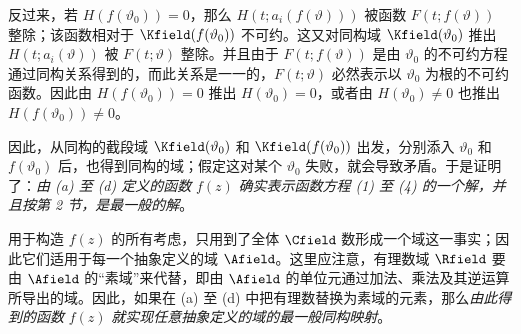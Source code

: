 反过来，若 $H(f(\vartheta_0))=0$，那么 $H(t;a_i(f(\vartheta)))$ 被函数 $F(t;f(\vartheta))$ 整除；该函数相对于 $\Kfield(f(\vartheta_0))$ 不可约。这又对同构域 $\Kfield(\vartheta_0)$ 推出 $H(t;a_i(\vartheta))$ 被 $F(t;\vartheta)$ 整除。并且由于 $F(t;f(\vartheta))$ 是由 $\vartheta_0$ 的不可约方程通过同构关系得到的，而此关系是一一的，$F(t;\vartheta)$ 必然表示以 $\vartheta_0$ 为根的不可约函数。因此由 $H(f(\vartheta_0))=0$ 推出 $H(\vartheta_0)=0$，或者由 $H(\vartheta_0)\ne0$ 也推出 $H(f(\vartheta_0))\ne0$。

因此，从同构的截段域 $\Kfield(\vartheta_0)$ 和 $\Kfield(f(\vartheta_0))$ 出发，分别添入 $\vartheta_0$ 和 $f(\vartheta_0)$ 后，也得到同构的域；假定这对某个 $\vartheta_0$ 失败，就会导致矛盾。于是证明了：\emph{由 (a) 至 (d) 定义的函数} $f(z)$ \emph{确实表示函数方程 (1) 至 (4) 的一个解，并且按第 2 节，是最一般的解}。

用于构造 $f(z)$ 的所有考虑，只用到了全体 $\Cfield$ 数形成一个域这一事实；因此它们适用于每一个抽象定义的域 $\Afield$。这里应注意，有理数域 $\Rfield$ 要由 $\Afield$ 的“素域”来代替，即由 $\Afield$ 的单位元通过加法、乘法及其逆运算所导出的域。因此，如果在 (a) 至 (d) 中把有理数替换为素域的元素，那么\emph{由此得到的函数} $f(z)$ \emph{就实现任意抽象定义的域的最一般同构映射}。

\medskip

